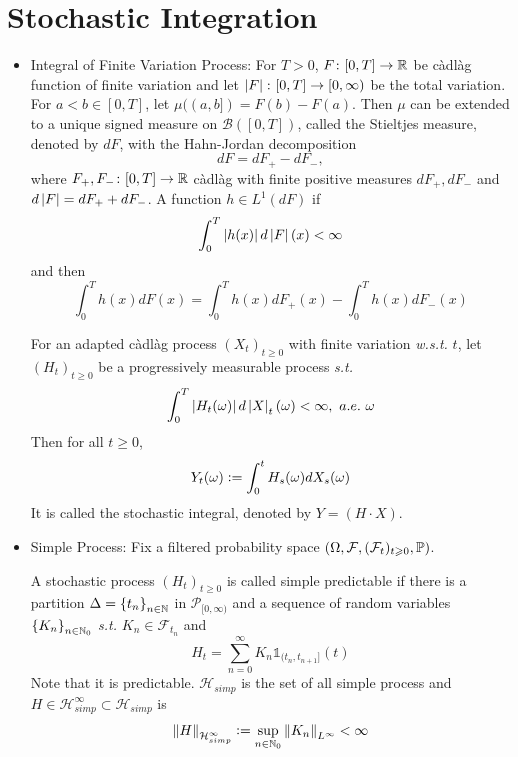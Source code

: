 \documentclass[a4paper,12pt]{article}
\begin{document}
\section{Stochastic Integration}
\begin{itemize}
  \item Integral of Finite Variation Process: For $T > 0$, $F \colon [0,T] \rightarrow \mathbb{R}$ be c\`adl\`ag function of finite variation and let $\left\lvert F\right\lvert \colon [0,T] \rightarrow [0,\infty)$ be the total variation. For $a<b \in [0,T]$, let $\mu((a,b]) = F(b) -F(a)$. Then $\mu$ can be extended to a unique signed measure on $\mathcal{B}([0,T])$, called the Stieltjes measure, denoted by $dF$, with the Hahn-Jordan decomposition
  \begin{equation*}
    dF = dF_+ - dF_-,
  \end{equation*}
  where $F_+,F_-\colon [0,T] \rightarrow \mathbb{R}$ c\`adl\`ag with finite positive measures $dF_+, dF_-$ and $d\left\lvert F\right\lvert = dF_+ + dF_-$. A function $h \in L^1(dF)$ if
  \begin{equation*}
    \int_0^T \left\lvert h(x)\right\lvert d\left\lvert F\right\lvert(x) < \infty
  \end{equation*}
  and then
  \begin{equation*}
    \int_0^T h(x) dF(x) = \int_0^T h(x)dF_+(x) - \int_0^T h(x)dF_-(x)
  \end{equation*}

  \noindent For an adapted c\`adl\`ag process $(X_t)_{t \geqslant 0}$ with finite variation \emph{w.s.t.} $t$, let $(H_t)_{t \geqslant 0}$ be a progressively measurable process \emph{s.t.}
  \begin{equation*}
    \int_0^T \left\lvert H_t(\omega)\right\lvert d \left\lvert X\right\lvert_t(\omega) < \infty,~a.e.~\omega
  \end{equation*}
  Then for all $t \geqslant 0$,
  \begin{equation*}
    Y_t(\omega) \vcentcolon= \int_0^t H_s(\omega) dX_s(\omega)
  \end{equation*}
  It is called the stochastic integral, denoted by $Y = (H\cdot X)$.

  \item Simple Process: Fix a filtered probability space $(\Omega, \mathcal{F},(\mathcal{F}_t)_{t \geqslant 0}, \mathbb{P})$. 

  \noindent A stochastic process $(H_t)_{t \geqslant 0}$ is called simple predictable if there is a partition $\Delta=\left\{t_n\right\}_{n \in \mathbb{N}}$ in $\mathcal{P}_{[0,\infty)}$ and a sequence of random variables $\left\{K_n\right\}_{n \in \mathbb{N}_0}$ \emph{s.t.} $K_n \in \mathcal{F}_{t_n}$ and
  \begin{equation*}
    H_t = \sum_{n=0}^{\infty} K_n\mathds{1}_{(t_n, t_{n+1}]}(t)
  \end{equation*}
  Note that it is predictable. $\mathcal{H}_{simp}$ is the set of all simple process and $H \in \mathcal{H}_{simp}^{\infty} \subset \mathcal{H}_{simp}$ is
  \begin{equation*}
    \left\lVert H\right\lVert_{\mathcal{H}_{simp}^{\infty}} \vcentcolon= \sup_{n\in \mathbb{N}_0} \left\lVert K_n\right\lVert_{L^{\infty}} < \infty
  \end{equation*}


\end{itemize}
\end{document}
